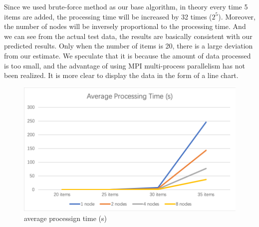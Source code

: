 \documentclass[12pt, a4paper, twocolumn]{article}
\begin{document}
    \begin{table}[h]
        \centering
        \caption{average processing time (s)}
    \end{table}

    Since we used brute-force method as our base algorithm, in theory every time 5 items are added, the processing time will be increased by 32 times ($2^5$). Moreover, the number of nodes will be inversely proportional to the processing time. And we can see from the actual test data, the results are basically consistent with our predicted results. Only when the number of items is 20, there is a large deviation from our estimate. We speculate that it is because the amount of data processed is too small, and the advantage of using MPI multi-process parallelism has not been realized. It is more clear to display the data in the form of a line chart.

    \begin{figure}[htb]
        \centering
        \includegraphics[scale=0.5]{line_chart.png}
        \caption{average processign time (s)}
    \end{figure}
\end{document}
